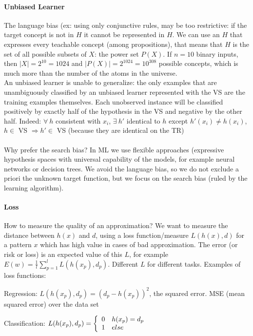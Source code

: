 \documentclass[10pt]{report}
\begin{document}
\paragraph{Unbiased Learner} The language bias (ex: using only conjunctive rules, may be too restrictive: if the target concept is not in $H$ it cannot be represented in $H$. We can use an $H$ that expresses every teachable concept (among propositions), that means that $H$ is the set of all possible subsets of $X$: the power set $P(X)$. If $n = 10$ binary inputs, then $|X| = 2^{10} = 1024$ and $|P(X)| = 2^{1024} = 10^{308}$ possible concepts, which is much more than the number of the atoms in the universe.\\
An unbiased learner is unable to generalize: the only examples that are unambiguously classified by an unbiased learner represented with the VS are the training examples themselves. Each unobserved instance will be classified positively by exactly half of the hypothesis in the VS and negative by the other half. Indeed: $\forall\: h$ consistent with $x_i$, $\exists\:h'$ identical to $h$ except $h'(x_i) \neq h(x_i)$, $h\in$ VS $\Rightarrow h'\in$ VS (because they are identical on the TR)\\\\
Why prefer the search bias? In ML we use flexible approaches (expressive hypothesis spaces with universal capability of the models, for example neural networks or decision trees. We avoid the language bias, so we do not exclude a priori the unknown target function, but we focus on the search bias (ruled by the learning algorithm).
\paragraph{Loss} How to measure the quality of an approximation? We want to measure the distance between $h(x)$ and $d$, using a loss function/measure $L(h(x), d)$ for a pattern $x$ which has high value in cases of bad approximation. The error (or risk or loss) is an expected value of this $L$, for example $E(w) = \frac{1}{l}\sum_{p=1}^l L(h(x_p), d_p)$. Different $L$ for different tasks. Examples of loss functions:
\begin{list}{}{}
	\item Regression: $L(h(x_p), d_p) = (d_p - h(x_p))^2$, the squared error. MSE (mean squared error) over the data set
	\item Classification: $L(h(x_p), d_p) = \left\{\begin{array}{l l}
		0 & h(x_p) = d_p\\
		1 & else
	\end{array}\right.$
\end{list}
\end{document}
